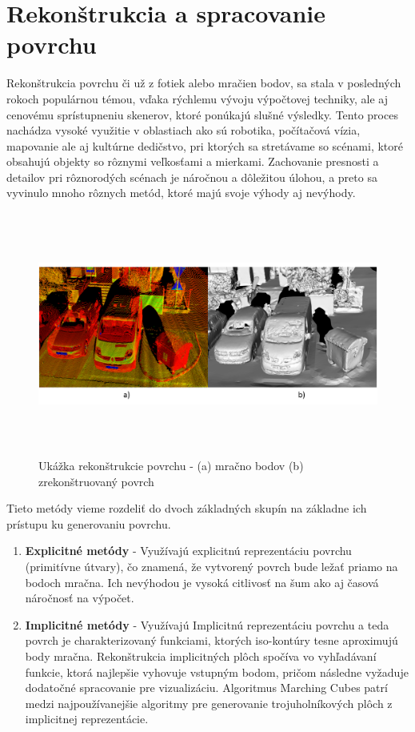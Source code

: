 \section{Rekonštrukcia a spracovanie povrchu}
\noindent Rekonštrukcia povrchu či už z fotiek alebo mračien bodov, sa stala v posledných rokoch populárnou témou, vďaka rýchlemu vývoju výpočtovej techniky, ale aj cenovému sprístupneniu skenerov, ktoré ponúkajú slušné výsledky. Tento proces nachádza vysoké využitie v oblastiach ako sú robotika, počítačová vízia, mapovanie ale aj kultúrne dedičstvo, pri ktorých sa stretávame so scénami, ktoré obsahujú objekty so rôznymi veľkosťami a mierkami. Zachovanie presnosti a detailov pri rôznorodých scénach je náročnou a dôležitou úlohou, a preto sa vyvinulo  mnoho rôznych metód, ktoré majú svoje výhody aj nevýhody.
\begin{figure}[!htbp]
  \centering
  \includegraphics[width=16cm, height=8cm]{img/mesh_example.png}
  \caption{Ukážka rekonštrukcie povrchu - (a) mračno bodov (b) zrekonštruovaný povrch}
  \label{recons}
\end{figure} 
\newline\indent Tieto metódy vieme rozdeliť do dvoch základných skupín na základne ich prístupu ku generovaniu povrchu.
\begin{enumerate}
    \item\textbf{Explicitné metódy} - Využívajú explicitnú reprezentáciu povrchu (primitívne útvary), čo znamená, že vytvorený povrch bude ležať priamo na bodoch mračna. Ich nevýhodou je vysoká citlivosť na šum ako aj časová náročnosť na výpočet.
    \item\textbf{Implicitné metódy} - Využívajú Implicitnú reprezentáciu povrchu a teda povrch je charakterizovaný funkciami, ktorých iso-kontúry tesne aproximujú body mračna. Rekonštrukcia implicitných plôch spočíva vo vyhľadávaní funkcie, ktorá najlepšie vyhovuje vstupným bodom, pričom následne vyžaduje dodatočné spracovanie pre vizualizáciu. Algoritmus Marching Cubes patrí medzi najpoužívanejšie algoritmy pre generovanie trojuholníkových plôch z implicitnej reprezentácie. \cite{Reconstruction_general}
\end{enumerate}


